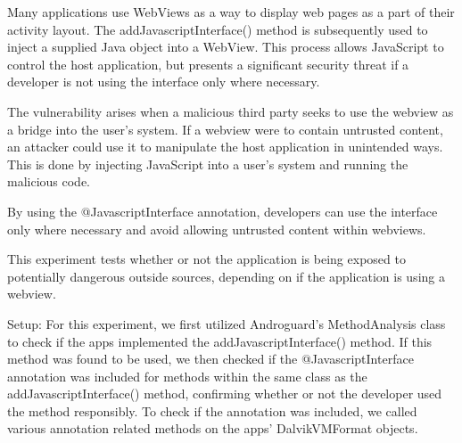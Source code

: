         Many applications use WebViews as a way to display web pages as a 
        part of their activity layout. The addJavascriptInterface() method 
        is subsequently used to inject a supplied Java object into a WebView. 
        This process allows JavaScript to control the host application, 
        but presents a significant security threat if a developer is not 
        using the interface only where necessary. 

        The vulnerability arises when a malicious third party seeks to use 
        the webview as a bridge into the user's system. If a webview were to
        contain untrusted content, an attacker could use it to manipulate the
        host application in unintended ways. This is done by injecting JavaScript 
        into a user's system and running the malicious code.
        
        By using the @JavascriptInterface annotation, developers can use the interface
        only where necessary and avoid allowing untrusted content within webviews.

        This experiment tests whether or not the application is being exposed to
        potentially dangerous outside sources, depending on if the application is
        using a webview.

        Setup: For this experiment, we first utilized Androguard's MethodAnalysis class to check if the apps 
        implemented the addJavascriptInterface() method. If this method was found to 
        be used, we then checked if the @JavascriptInterface annotation was included 
        for methods within the same class as the addJavascriptInterface() method, confirming whether or not 
        the developer used the method responsibly. To check if the annotation was included, we called 
        various annotation related methods on the apps' DalvikVMFormat objects.
